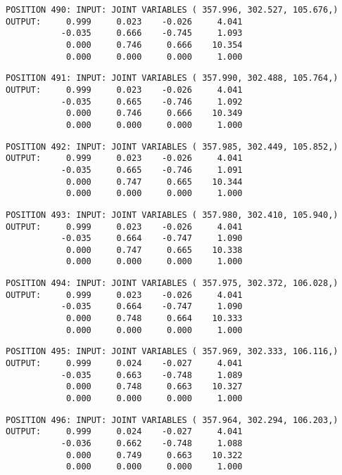 \begin{verbatim}
POSITION 490: INPUT: JOINT VARIABLES ( 357.996, 302.527, 105.676,)
OUTPUT:     0.999     0.023    -0.026     4.041
           -0.035     0.666    -0.745     1.093
            0.000     0.746     0.666    10.354
            0.000     0.000     0.000     1.000
\end{verbatim} \pagebreak[1]\begin{verbatim}
POSITION 491: INPUT: JOINT VARIABLES ( 357.990, 302.488, 105.764,)
OUTPUT:     0.999     0.023    -0.026     4.041
           -0.035     0.665    -0.746     1.092
            0.000     0.746     0.666    10.349
            0.000     0.000     0.000     1.000
\end{verbatim} \pagebreak[1]\begin{verbatim}
POSITION 492: INPUT: JOINT VARIABLES ( 357.985, 302.449, 105.852,)
OUTPUT:     0.999     0.023    -0.026     4.041
           -0.035     0.665    -0.746     1.091
            0.000     0.747     0.665    10.344
            0.000     0.000     0.000     1.000
\end{verbatim} \pagebreak[1]\begin{verbatim}
POSITION 493: INPUT: JOINT VARIABLES ( 357.980, 302.410, 105.940,)
OUTPUT:     0.999     0.023    -0.026     4.041
           -0.035     0.664    -0.747     1.090
            0.000     0.747     0.665    10.338
            0.000     0.000     0.000     1.000
\end{verbatim} \pagebreak[1]\begin{verbatim}
POSITION 494: INPUT: JOINT VARIABLES ( 357.975, 302.372, 106.028,)
OUTPUT:     0.999     0.023    -0.026     4.041
           -0.035     0.664    -0.747     1.090
            0.000     0.748     0.664    10.333
            0.000     0.000     0.000     1.000
\end{verbatim} \pagebreak[1]\begin{verbatim}
POSITION 495: INPUT: JOINT VARIABLES ( 357.969, 302.333, 106.116,)
OUTPUT:     0.999     0.024    -0.027     4.041
           -0.035     0.663    -0.748     1.089
            0.000     0.748     0.663    10.327
            0.000     0.000     0.000     1.000
\end{verbatim} \pagebreak[1]\begin{verbatim}
POSITION 496: INPUT: JOINT VARIABLES ( 357.964, 302.294, 106.203,)
OUTPUT:     0.999     0.024    -0.027     4.041
           -0.036     0.662    -0.748     1.088
            0.000     0.749     0.663    10.322
            0.000     0.000     0.000     1.000
\end{verbatim} \pagebreak[1]\begin{verbatim}

\end{verbatim}
